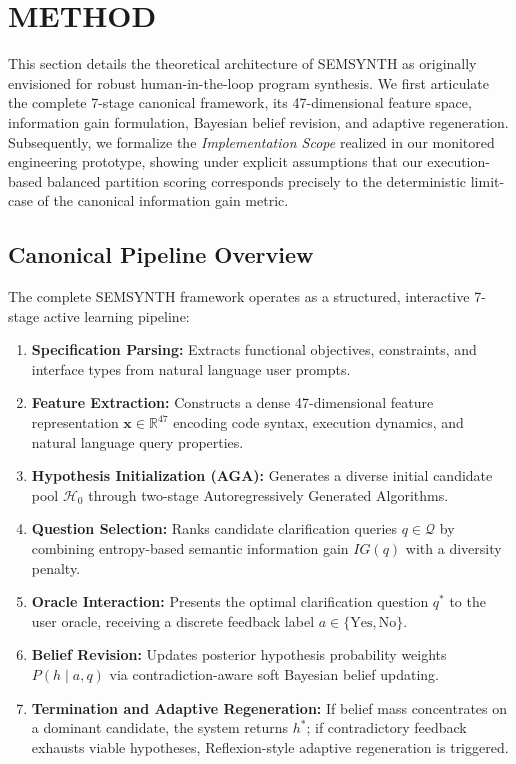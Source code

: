 \section{METHOD}\label{sec:method}

This section details the theoretical architecture of SEMSYNTH as originally envisioned for robust human-in-the-loop program synthesis. We first articulate the complete 7-stage canonical framework, its 47-dimensional feature space, information gain formulation, Bayesian belief revision, and adaptive regeneration. Subsequently, we formalize the \textit{Implementation Scope} realized in our monitored engineering prototype, showing under explicit assumptions that our execution-based balanced partition scoring corresponds precisely to the deterministic limit-case of the canonical information gain metric.

\subsection{Canonical Pipeline Overview}

The complete SEMSYNTH framework operates as a structured, interactive 7-stage active learning pipeline:
\begin{enumerate}
    \item \textbf{Specification Parsing:} Extracts functional objectives, constraints, and interface types from natural language user prompts.
    \item \textbf{Feature Extraction:} Constructs a dense 47-dimensional feature representation $\mathbf{x} \in \mathbb{R}^{47}$ encoding code syntax, execution dynamics, and natural language query properties.
    \item \textbf{Hypothesis Initialization (AGA):} Generates a diverse initial candidate pool $\mathcal{H}_0$ through two-stage Autoregressively Generated Algorithms.
    \item \textbf{Question Selection:} Ranks candidate clarification queries $q \in \mathcal{Q}$ by combining entropy-based semantic information gain $IG(q)$ with a diversity penalty.
    \item \textbf{Oracle Interaction:} Presents the optimal clarification question $q^*$ to the user oracle, receiving a discrete feedback label $a \in \{\text{Yes}, \text{No}\}$.
    \item \textbf{Belief Revision:} Updates posterior hypothesis probability weights $P(h \mid a, q)$ via contradiction-aware soft Bayesian belief updating.
    \item \textbf{Termination and Adaptive Regeneration:} If belief mass concentrates on a dominant candidate, the system returns $h^*$; if contradictory feedback exhausts viable hypotheses, Reflexion-style adaptive regeneration is triggered.
\end{enumerate}

